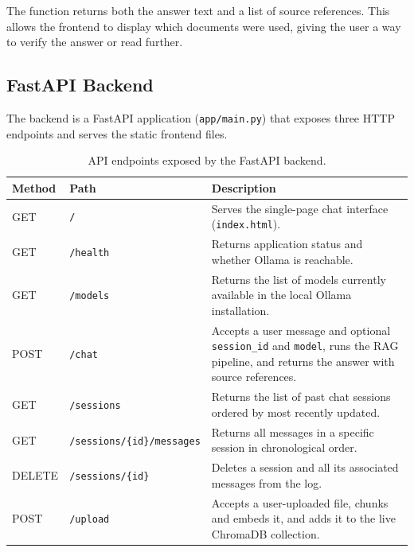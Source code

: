 The function returns both the answer text and a list of source references. This allows the frontend to display which documents were used, giving the user a way to verify the answer or read further.

\subsection{FastAPI Backend}
\label{sec:impl-backend}

The backend is a FastAPI application (\texttt{app/main.py}) that exposes three HTTP endpoints and serves the static frontend files.

\begin{table}[H]
    \centering
    \begin{tabular}{|l|l|p{}|}
        \hline
        \textbf{Method} & \textbf{Path} & \textbf{Description} \\
        \hline \hline
        GET    & \texttt{/}                              & Serves the single-page chat interface (\texttt{index.html}). \\
        \hline
        GET    & \texttt{/health}                        & Returns application status and whether Ollama is reachable. \\
        \hline
        GET    & \texttt{/models}                        & Returns the list of models currently available in the local Ollama installation. \\
        \hline
        POST   & \texttt{/chat}                          & Accepts a user message and optional \texttt{session\_id} and \texttt{model}, runs the RAG pipeline, and returns the answer with source references. \\
        \hline
        GET    & \texttt{/sessions}                      & Returns the list of past chat sessions ordered by most recently updated. \\
        \hline
        GET    & \texttt{/sessions/\{id\}/messages}      & Returns all messages in a specific session in chronological order. \\
        \hline
        DELETE & \texttt{/sessions/\{id\}}               & Deletes a session and all its associated messages from the log. \\
        \hline
        POST   & \texttt{/upload}                        & Accepts a user-uploaded file, chunks and embeds it, and adds it to the live ChromaDB collection. \\
        \hline
    \end{tabular}
    \caption{API endpoints exposed by the FastAPI backend.}
    \label{tab:endpoints}
\end{table}

